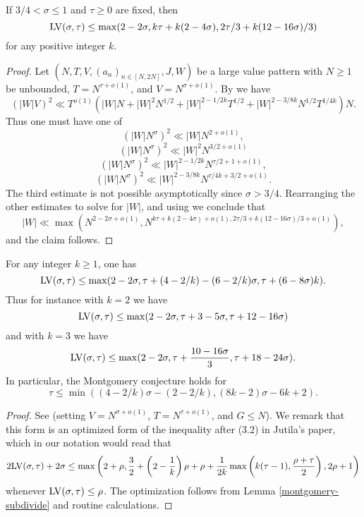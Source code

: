 \begin{lemma}\label{hb-lvt-2} If $3/4 < \sigma \leq 1$ and $\tau \geq 0$ are fixed, then
    $$ \mathrm{LV}(\sigma,\tau) \leq \max( 2-2\sigma, k\tau + k(2-4\sigma), 2\tau/3 + k(12-16\sigma)/3 )$$
    for any positive integer $k$.
    \end{lemma}

\begin{proof} Let $(N,T,V,(a_n)_{n \in [N,2N]},J,W)$ be a large value pattern with $N \geq 1$ be unbounded, $T = N^{\tau + o(1)}$, and $V = N^{\sigma + o(1)}$. By \cite[Lemma~6]{heathbrown_large_1979} we have
    $$ (|W| V)^2 \ll T^{o(1)}( |W|N + |W|^2 N^{1/2} + |W|^{2-1/2k} T^{1/2} + |W|^{2-3/8k} N^{1/2} T^{1/4k}) N.$$
    Thus one must have one of
$$ (|W| N^\sigma)^2 \ll |W|N^{2+o(1)},$$
$$ (|W| N^\sigma)^2 \ll |W|^2 N^{3/2+o(1)}$$
$$ (|W| N^\sigma)^2 \ll |W|^{2-1/2k} N^{\tau/2+1+o(1)},$$
$$ (|W| N^\sigma)^2 \ll |W|^{2-3/8k} N^{\tau/4k + 3/2+ o(1)}.$$
The third estimate is not possible asymptotically since $\sigma > 3/4$.  Rearranging the other estimates to solve for $|W|$, and using we conclude that
$$ |W| \ll \max\left( N^{2-2\sigma+o(1)}, N^{k\tau + k(2-4\sigma)+o(1), 2\tau/3 + k(12-16\sigma)/3 + o(1)}\right),$$
and the claim follows.
\end{proof}

\begin{theorem}\label{jutila-lvt}  For any integer $k \geq 1$, one has
$$ \mathrm{LV}(\sigma,\tau) \leq \max(2-2\sigma, \tau + (4-2/k) - (6-2/k)\sigma, \tau + (6-8\sigma)k).$$
Thus for instance with $k=2$ we have
$$ \mathrm{LV}(\sigma,\tau) \leq \max(2-2\sigma, \tau + 3 - 5\sigma, \tau + 12-16\sigma)$$
and with $k=3$ we have
$$ \mathrm{LV}(\sigma,\tau) \leq \max(2-2\sigma, \tau + \frac{10-16\sigma}{3}, \tau + 18-24\sigma).$$
In particular, the Montgomery conjecture holds for
$$ \tau \leq \min( (4-2/k)\sigma - (2-2/k), (8k-2)\sigma - 6k + 2).$$
\end{theorem}

\literature
{}

\begin{proof} See \cite[(1.4)]{jutila_zero_density_1977} (setting $V = N^{\sigma+o(1)}$, $T = N^{\tau+o(1)}$, and $G \leq N$).  We remark that this form is an optimized form of the inequality after (3.2) in Jutila's paper, which in our notation would read that
$$ 2\mathrm{LV}(\sigma,\tau) + 2\sigma \leq \max \left(2 + \rho, \frac{3}{2} + \left(2 - \frac{1}{k}\right)\rho + \rho + \frac{1}{2k}\max\left(k(\tau-1), \frac{\rho+\tau}{2}\right), 2\rho + 1\right)$$
whenever $\mathrm{LV}(\sigma,\tau) \leq \rho$.  The optimization follows from Lemma \ref{montgomery-subdivide} and routine calculations.
\end{proof}

